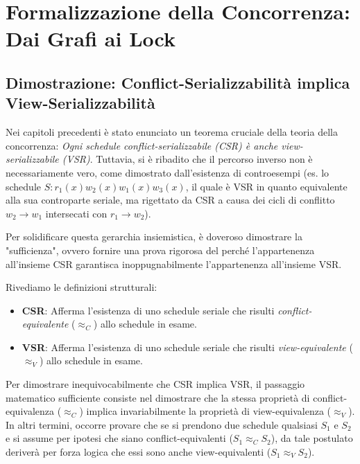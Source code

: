 
\chapter{Formalizzazione della Concorrenza: Dai Grafi ai Lock}

\section{Dimostrazione: Conflict-Serializzabilità implica View-Serializzabilità}

Nei capitoli precedenti è stato enunciato un teorema cruciale della teoria della concorrenza: \textit{Ogni schedule conflict-serializzabile (CSR) è anche view-serializzabile (VSR)}. Tuttavia, si è ribadito che il percorso inverso non è necessariamente vero, come dimostrato dall'esistenza di controesempi (es. lo schedule $S: r_1(x) w_2(x) w_1(x) w_3(x)$, il quale è VSR in quanto equivalente alla sua controparte seriale, ma rigettato da CSR a causa dei cicli di conflitto $w_2 \to w_1$ intersecati con $r_1 \to w_2$).

Per solidificare questa gerarchia insiemistica, è doveroso dimostrare la "sufficienza", ovvero fornire una prova rigorosa del perché l'appartenenza all'insieme CSR garantisca inoppugnabilmente l'appartenenza all'insieme VSR.

Rivediamo le definizioni strutturali:
\begin{itemize}
    \item \textbf{CSR}: Afferma l'esistenza di uno schedule seriale che risulti \textit{conflict-equivalente} ($\approx_C$) allo schedule in esame.
    \item \textbf{VSR}: Afferma l'esistenza di uno schedule seriale che risulti \textit{view-equivalente} ($\approx_V$) allo schedule in esame.
\end{itemize}

Per dimostrare inequivocabilmente che CSR implica VSR, il passaggio matematico sufficiente consiste nel dimostrare che la stessa proprietà di conflict-equivalenza ($\approx_C$) implica invariabilmente la proprietà di view-equivalenza ($\approx_V$). In altri termini, occorre provare che se si prendono due schedule qualsiasi $S_1$ e $S_2$ e si assume per ipotesi che siano conflict-equivalenti ($S_1 \approx_C S_2$), da tale postulato deriverà per forza logica che essi sono anche view-equivalenti ($S_1 \approx_V S_2$).

